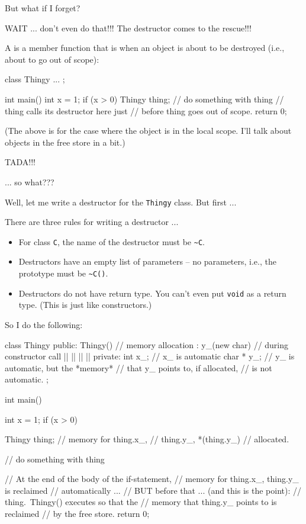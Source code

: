 But what if I forget?

WAIT ... don't even do that!!! The destructor comes
to the rescue!!!

A  is a member function that is
 when an object is about to be destroyed (i.e., about to
go out of scope):

\begin{consolethree}[escapeinside=||]
class Thingy
{
    ...
};

int main()
{
    int x = 1;
    if (x > 0)
    {
        Thingy thing;
        // do something with thing
    } // thing calls its destructor here just
      // before thing goes out of scope.
    return 0;
}
\end{consolethree}

(The above is for the case where the object is in the local scope.
I'll talk about objects in the free store in a bit.)

TADA!!!

... so what???

Well, let me write a destructor for the \texttt{Thingy} class. But first
...

There are three rules for writing a destructor ...

\begin{itemize}
\item For class \texttt{C}, the name of the destructor must be
  \texttt{\~{}C}.
\item Destructors have an empty list of parameters -- no parameters, i.e.,
  the prototype must be \texttt{\~{}C()}.
\item Destructors do not have return type. You can't even
  put \texttt{void} as a return type. (This is just like constructors.)
\end{itemize}

So I do the following:

\begin{consolethree}[escapeinside=||]
class Thingy
{
public:
    Thingy()             // memory allocation
        : y_(new char)   // during constructor call
    {}
    ||
    |\EMPHASIZE{\{}|
        ||
    |\EMPHASIZE{\}}|
private:
    int x_;     // x_ is automatic
    char * y_;  // y_ is automatic, but the *memory*
                // that y_ points to, if allocated,
                // is not automatic.
};

int main()
{
    int x = 1;
    if (x > 0)
    {
        Thingy thing; // memory for thing.x_,
                      // thing.y_, *(thing.y_)
                      // allocated.
                      
        // do something with thing
        
    } // At the end of the body of the if-statement,
      // memory for thing.x_, thing.y_ is reclaimed
      // automatically ...
      // BUT before that ... (and this is the point):
      // thing.~Thingy() executes so that the
      // memory that thing.y_ points to is reclaimed
      // by the free store.
    return 0;
}
\end{consolethree}

